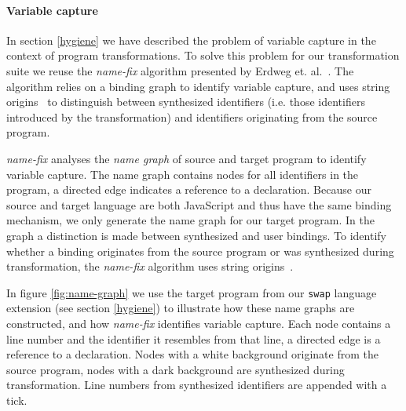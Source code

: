 \paragraph{Variable capture}
In section \ref{hygiene} we have described the problem of variable capture in the context of program transformations. To solve this problem for our transformation suite we reuse the \textit{name-fix} algorithm presented by Erdweg et. al.~\cite{Erdweg2014}. The algorithm relies on a binding graph to identify variable capture, and uses string origins~\cite{Inostroza2014} to distinguish between synthesized identifiers (i.e. those identifiers introduced by the transformation) and identifiers originating from the source program.

\textit{name-fix} analyses the \textit{name graph} of source and target program to identify variable capture. The name graph contains nodes for all identifiers in the program, a directed edge indicates a reference to a declaration. Because our source and target language are both JavaScript and thus have the same binding mechanism, we only generate the name graph for our target program. In the graph a distinction is made between synthesized and user bindings. To identify whether a binding originates from the source program or was synthesized during transformation, the \textit{name-fix} algorithm uses string origins~\cite{Inostroza2014}. 

In figure \ref{fig:name-graph} we use the target program from our \lstinline$swap$ language extension (see section \ref{hygiene}) to illustrate how these name graphs are constructed, and how \textit{name-fix} identifies variable capture. Each node contains a line number and the identifier it resembles from that line, a directed edge is a reference to a declaration. Nodes with a white background originate from the source program, nodes with a dark background are synthesized during transformation. Line numbers from synthesized identifiers are appended with a tick.

